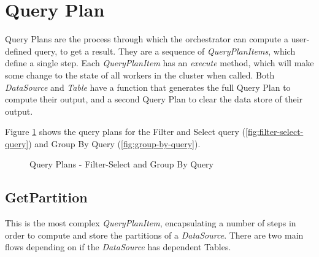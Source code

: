 \section{Query Plan}
Query Plans are the process through which the orchestrator can compute a user-defined query, to get a result. They are a sequence of \textit{QueryPlanItems}, which define a single step. Each \textit{QueryPlanItem} has an \textit{execute} method, which will make some change to the state of all workers in the cluster when called. Both \textit{DataSource} and \textit{Table} have a function that generates the full Query Plan to compute their output, and a second Query Plan to clear the data store of their output. 

Figure \ref{fig:filter-group-by-query-plan} shows the query plans for the Filter and Select query (\ref{fig:filter-select-query}) and Group By Query (\ref{fig:group-by-query}).

\begin{figure}
	\centering
	\qquad
	\caption{Query Plans - Filter-Select and Group By Query}%
	\label{fig:filter-group-by-query-plan}
\end{figure}

\subsection{GetPartition}\label{subsec:get-partition}
This is the most complex \textit{QueryPlanItem}, encapsulating a number of steps in order to compute and store the partitions of a \textit{DataSource}. There are two main flows depending on if the \textit{DataSource} has dependent Tables.

